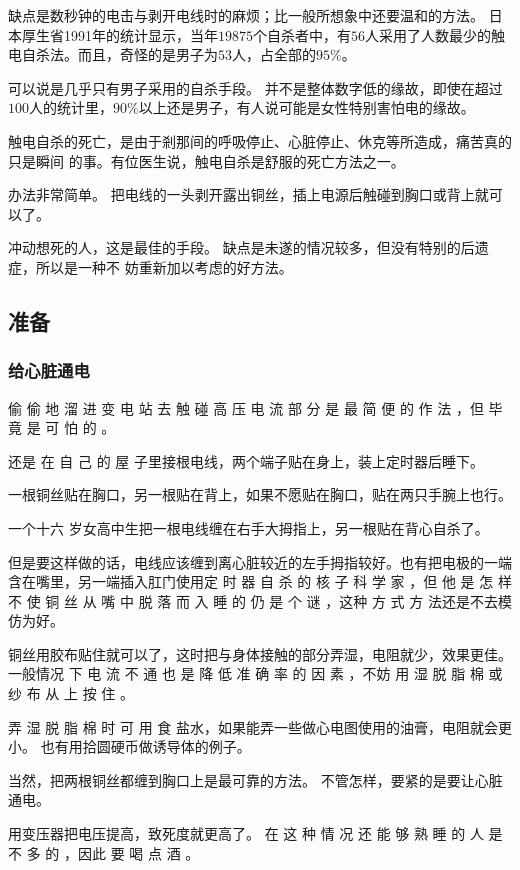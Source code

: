 \documentclass[UTF8]{ctexart}
\begin{document}
缺点是数秒钟的电击与剥开电线时的麻烦；比一般所想象中还要温和的方法。
日本厚生省1991年的统计显示，当年$19875$个自杀者中，有$56$人采用了人数最少的触电自杀法。而且，奇怪的是男子为$53$人，占全部的$95\%$。

可以说是几乎只有男子采用的自杀手段。
并不是整体数字低的缘故，即使在超过$100$人的统计里，$90\%$以上还是男子，有人说可能是女性特别害怕电的缘故。

触电自杀的死亡，是由于剎那间的呼吸停止、心脏停止、休克等所造成，痛苦真的只是瞬间 的事。有位医生说，触电自杀是舒服的死亡方法之一。

办法非常简单。
把电线的一头剥开露出铜丝，插上电源后触碰到胸口或背上就可以了。

冲动想死的人，这是最佳的手段。
缺点是未遂的情况较多，但没有特别的后遗症，所以是一种不 妨重新加以考虑的好方法。

\subsection{准备}

\subsubsection*{给心脏通电}

偷 偷 地 溜 进 变 电 站 去 触 碰 高 压 电 流 部 分 是 最 简 便 的 作 法 ，但 毕 竟 是 可 怕 的 。

还是 在 自 己 的 屋 子里接根电线，两个端子贴在身上，装上定时器后睡下。 

一根铜丝贴在胸口，另一根贴在背上，如果不愿贴在胸口，贴在两只手腕上也行。

一个十六 岁女高中生把一根电线缠在右手大拇指上，另一根贴在背心自杀了。

但是要这样做的话，电线应该缠到离心脏较近的左手拇指较好。也有把电极的一端含在嘴里，另一端插入肛门使用定 时 器 自 杀 的 核 子 科 学 家 ，但 他 是 怎 样 不 使 铜 丝 从 嘴 中 脱 落 而 入 睡 的 仍 是 个 谜 ，这种 方 式 方 法还是不去模仿为好。

铜丝用胶布贴住就可以了，这时把与身体接触的部分弄湿，电阻就少，效果更佳。一般情况 下 电 流 不 通 也 是 降 低 准 确 率 的 因 素 ，不妨 用 湿 脱 脂 棉 或 纱 布 从 上 按 住 。

弄 湿 脱 脂 棉 时 可 用 食 盐水，如果能弄一些做心电图使用的油膏，电阻就会更小。
也有用拾圆硬币做诱导体的例子。

当然，把两根铜丝都缠到胸口上是最可靠的方法。 
不管怎样，要紧的是要让心脏通电。

用变压器把电压提高，致死度就更高了。 
在 这 种 情 况 还 能 够 熟 睡 的 人 是 不 多 的 ，因此 要 喝 点 酒 。
\end{document}

